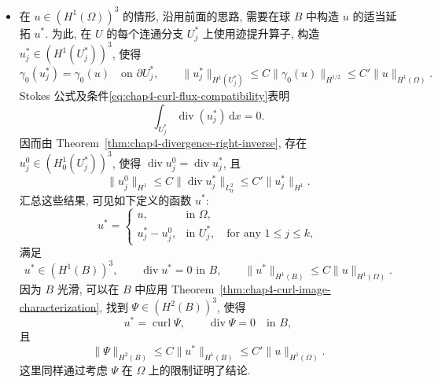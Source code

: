 \begin{Proof}
\begin{itemize}
 \item 在 $u\in(H^1(\Omega))^3$ 的情形, 沿用前面的思路, 需要在球 $B$ 中构造
 $u$ 的适当延拓 $u^*$. 为此, 在 $U$ 的每个连通分支 $U_j^*$ 上使用迹提升算子,
 构造 $u_j^*\in(H^1(U_j^*))^3$, 使得
 \[
  \gamma_0(u_j^*)=\gamma_0(u)\quad\text{on }\partial U_j^*,
  \qquad
  \|u_j^*\|_{H^1(U_j^*)}\leq C\|\gamma_0(u)\|_{H^{1/2}}
  \leq C'\|u\|_{H^1(\Omega)}.
 \]
 Stokes 公式及条件\eqref{eq:chap4-curl-flux-compatibility}表明
 \[
  \int_{U_j^*}\operatorname{div}(u_j^*)\,\mathrm dx=0.
 \]
 因而由 Theorem~\ref{thm:chap4-divergence-right-inverse}, 存在
 $u_j^0\in(H_0^1(U_j^*))^3$, 使得
 $\operatorname{div}u_j^0=\operatorname{div}u_j^*$, 且
 \[
  \|u_j^0\|_{H^1}\leq C\|\operatorname{div}u_j^*\|_{L_0^2}
  \leq C'\|u_j^*\|_{H^1}.
 \]
 汇总这些结果, 可见如下定义的函数 $u^*$:
 \[
  u^*=\begin{cases}
  u,&\text{in }\Omega,\\
  u_j^*-u_j^0,&\text{in }U_j^*,\quad\text{for any }1\leq j\leq k,
  \end{cases}
 \]
 满足
 \[
  u^*\in(H^1(B))^3,\qquad
  \operatorname{div}u^*=0\text{ in }B,\qquad
  \|u^*\|_{H^1(B)}\leq C\|u\|_{H^1(\Omega)}.
 \]
 因为 $B$ 光滑, 可以在 $B$ 中应用
 Theorem~\ref{thm:chap4-curl-image-characterization}, 找到
 $\Psi\in(H^2(B))^3$, 使得
 \[
  u^*=\operatorname{curl}\Psi,\qquad\operatorname{div}\Psi=0\quad\text{in }B,
 \]
 且
 \[
  \|\Psi\|_{H^2(B)}\leq C\|u^*\|_{H^1(B)}
  \leq C'\|u\|_{H^1(\Omega)}.
 \]
 这里同样通过考虑 $\Psi$ 在 $\Omega$ 上的限制证明了结论.
\end{itemize}
\end{Proof}
